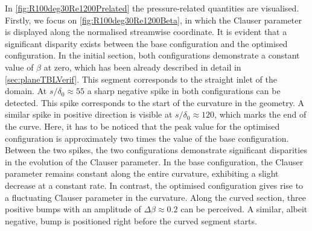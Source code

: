 In \autoref{fig:R100deg30Re1200Prelated} the pressure-related quantities are visualised.
Firstly, we focus on \autoref{fig:R100deg30Re1200Beta}, in which the Clauser parameter is displayed along the normalised streamwise coordinate.
It is evident that a significant disparity exists between the base configuration and the optimised configuration.
In the initial section, both configurations demonstrate a constant value of $\beta$ at zero, which has been already described in detail in \autoref{sec:planeTBLVerif}.
This segment corresponds to the straight inlet of the domain.
At $s/\delta_0 \approx 55$ a sharp negative spike in both configurations can be detected.
This spike corresponds to the start of the curvature in the geometry. 
A similar spike in positive direction is visible at $s/\delta_0 \approx 120$, which marks the end of the curve.
Here, it has to be noticed that the peak value for the optimised configuration is approximately two times the value of the base configuration.
Between the two spikes, the two configurations demonstrate significant disparities in the evolution of the Clauser parameter.
In the base configuration, the Clauser parameter remains constant along the entire curvature,  exhibiting a slight decrease at a constant rate. 
In contrast, the optimised configuration  gives rise to  a fluctuating Clauser parameter in the curvature.
Along the curved section, three positive bumps with an amplitude of $\Delta\beta \approx 0.2$ can be perceived.
A similar, albeit negative,  bump  is positioned right before the curved segment starts.

